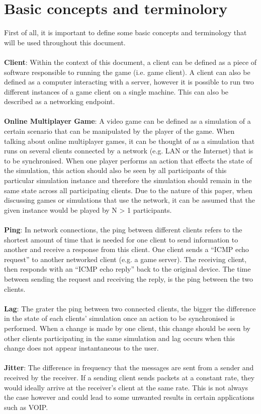 \section{Basic concepts and terminolory}
First of all, it is important to define some basic concepts and terminology that will be used throughout this document.
\\
\\
\textbf{Client}: Within the context of this document, a client can be defined as a piece of software responsible to running the game (i.e. game client). A client can also be defined as a computer interacting with a server, however it is possible to run two different instances of a game client on a single machine. This can also be described as a networking endpoint.
\\
\\
\textbf{Online Multiplayer Game}: A video game can be defined as a simulation of a certain scenario that can be manipulated by the player of the game. When talking about online multiplayer games, it can be thought of as a simulation that runs on several clients connected by a network (e.g. LAN or the Internet) that is to be synchronised. When one player performs an action that effects the state of the simulation, this action should also be seen by all participants of this particular simulation instance and therefore the simulation should remain in the same state across all participating clients. Due to the nature of this paper, when discussing games or simulations that use the network, it can be assumed that the given instance would be played by N > 1 participants.
\\
\\
\textbf{Ping}: In network connections, the ping between different clients refers to the shortest amount of time that is needed for one client to send information to another and receive a response from this client. One client sends a ``ICMP echo request'' to another networked client (e.g. a game server). The receiving client, then responds with an ``ICMP echo reply'' back to the original device. The time between sending the request and receiving the reply, is the ping between the two clients.
\\
\\
\textbf{Lag}: The grater the ping between two connected clients, the bigger the difference in the state of each clients' simulation once an action to be synchronised is performed. When a change is made by one client, this change should be seen by other clients participating in the same simulation and lag occurs when this change does not appear instantaneous to the user.
\\
\\
\textbf{Jitter}: The difference in frequency that the messages are sent from a sender and received by the receiver. If a sending client sends packets at a constant rate, they would ideally arrive at the receiver's client at the same rate. This is not always the case however and could lead to some unwanted results in certain applications such as VOIP.
